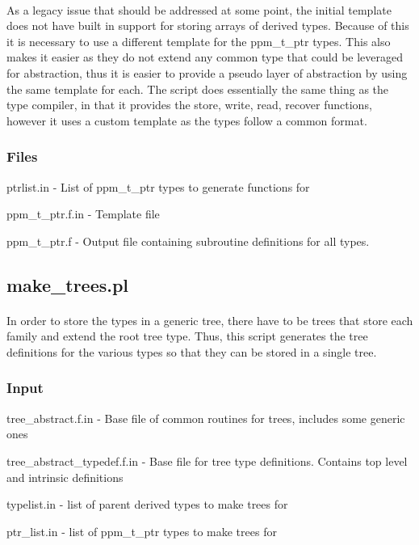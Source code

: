 \documentclass{article}
\begin{document}
\paragraph{}
As a legacy issue that should be addressed at some point, the initial template does not have built in support for storing arrays of derived types. Because of this it is necessary to use a different template for the ppm\_t\_ptr types. This also makes it easier as they do not extend any common type that could be leveraged for abstraction, thus it is easier to provide a pseudo layer of abstraction by using the same template for each. The script does essentially the same thing as the type compiler, in that it provides the store, write, read, recover functions, however it uses a custom template as the types follow a common format.
\subsubsection{Files}
\begin{list}{}{}
\item ptrlist.in - List of ppm\_t\_ptr types to generate functions for
\item ppm\_t\_ptr.f.in - Template file
\item ppm\_t\_ptr.f - Output file containing subroutine definitions for all types.
\end{list}

\subsection{make\_trees.pl}
\paragraph{}
In order to store the types in a generic tree, there have to be trees that store each family and extend the root tree type. Thus, this script generates the tree definitions for the various types so that they can be stored in a single tree.
\subsubsection{Input}
\begin{list}{}{}
\item tree\_abstract.f.in - Base file of common routines for trees, includes some generic ones
\item tree\_abstract\_typedef.f.in - Base file for tree type definitions. Contains top level and intrinsic definitions
\item typelist.in - list of parent derived types to make trees for
\item ptr\_list.in - list of ppm\_t\_ptr types to make trees for
\end{list}
\end{document}

